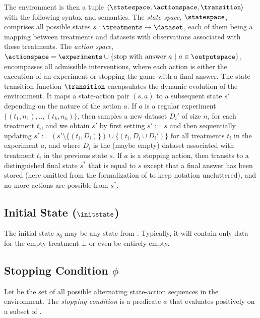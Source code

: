 \documentclass{uai2024} %
\begin{document}
        The environment is then a tuple $\langle \statespace, \actionspace, \transition \rangle$ with the following syntax and semantics.
        The \emph{state space}, $\statespace$, comprises all possible states $s: \treatments \rightarrow \dataset$, each of them being a mapping between treatments and datasets with observations associated with these treatments. 
        The \emph{action space}, $\actionspace = \experiments \cup \{\text{stop with answer } a ~|~ a \in \outputspace\}$, encompasses all admissible interventions, where each action is either the execution of an experiment or stopping the game with a final answer.
        The state transition function $\transition$ encapsulates the dynamic evolution of the environment. 
        It maps a state-action pair $(s, a)$ to a subsequent state $s'$ depending on the nature of the action $a$.
        If $a$ is a regular experiment $\{(t_1, n_1),..,(t_k,n_k)\}$, then \transition samples a new dataset $D_i'$ of size $n_i$ for each treatment $t_i$, and we obtain $s'$ by first setting $s' := s$ and then sequentially updating $s' := (s' \setminus \{(t_i, D_i)\}) \cup \{(t_i, D_i \cup D_i')\}$ for all treatments $t_i$ in the experiment $a$, and where $D_i$ is the (maybe empty) dataset associated with treatment $t_i$ in the previous state $s$.
        If $a$ is a stopping action, then \transition transits to a distinguished final state $s^*$ that is equal to $s$ except that a final answer has been stored (here omitted from the formalization of \statespace to keep notation uncluttered), and no more actions are possible from $s^*$.
        


    \subsection{Initial State ($\initstate$)}
        The initial state $s_0$ may be any state from \statespace.
        Typically, it will contain only data for the empty treatment $\bot$ or even be entirely empty.



    \subsection{Stopping Condition $\phi$}
        Let \runs be the set of all possible alternating state-action sequences in the environment.
        The \emph{stopping condition} is a predicate $\phi$ that evaluates positively on a subset of \runs.
    
\end{document}
